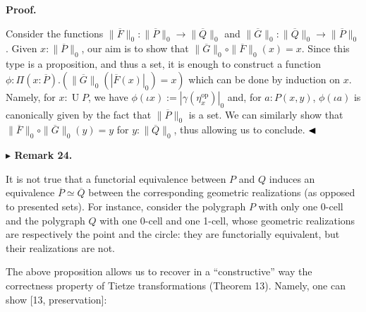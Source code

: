 \par\medskip\noindent\textbf{Proof.}\par
 
 
Consider the functions $\|\overline{F}\|_{0}:\|\overline{P}\|_{0}\to\|\overline{Q}\|_{0}$ and $\|\overline{G}\|_{0}:\|\overline{Q}\|_{0}\to\|\overline{P}\|_{0}$. Given $x:\|\overline{P}\|_{0}$, our aim is to show that $\|\overline{G}\|_{0}\circ\|\overline{F}\|_{0}(x)=x$. Since this type is a proposition, and thus a set, it is enough to construct a function $\phi:\Pi(x:\overline{P}).(\|\overline{G}\|_{0}(|\overline{F}(x)|_{0})=x)$ which can be done by induction on $x$. Namely, for $x:\operatorname{U}P$, we have $\phi(\iota x):=|\gamma(\eta_{x}^{\mathrm{op}})|_{0}$ and, for $a:P(x,y)$, $\phi(\iota a)$ is canonically given by the fact that $\|\overline{P}\|_{0}$ is a set. We can similarly show that $\|\overline{F}\|_{0}\circ\|\overline{G}\|_{0}(y)=y$ for $y:\|\overline{Q}\|_{0}$, thus allowing us to conclude. $\hfill\blacktriangleleft$\par
 
 
 
\par\medskip\noindent\textbf{$\blacktriangleright$ Remark 24.}\par
 
 
It is not true that a functorial equivalence between $P$ and $Q$ induces an equivalence $\overline{P}\simeq\overline{Q}$ between the corresponding geometric realizations (as opposed to presented sets). For instance, consider the polygraph $P$ with only one 0-cell and the polygraph $Q$ with one 0-cell and one 1-cell, whose geometric realizations are respectively the point and the circle: they are functorially equivalent, but their realizations are not.\par
 
 
 
 
The above proposition allows us to recover in a “constructive” way the correctness property of Tietze transformations (Theorem 13). Namely, one can show [13, preservation]:\par
 
 
